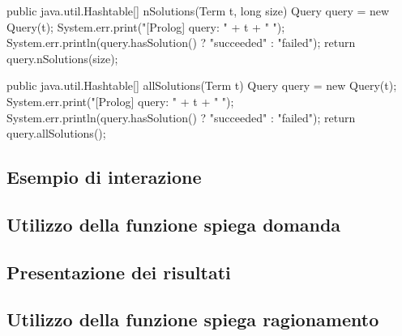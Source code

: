 \begin{javacode}
{    public java.util.Hashtable[] nSolutions(Term t, long size) {
      Query query = new Query(t);
      System.err.print("[Prolog] query: " + t + " ");
      System.err.println(query.hasSolution() ? "succeeded" : "failed");
      return query.nSolutions(size);
    }
    
    public java.util.Hashtable[] allSolutions(Term t) {
      Query query = new Query(t);
      System.err.print("[Prolog] query: " + t + " ");
      System.err.println(query.hasSolution() ? "succeeded" : "failed");
      return query.allSolutions();
    }
  }
    \end{javacode}
    
    
    

\subsection{Esempio di interazione}

\subsection{Utilizzo della funzione spiega domanda}

\subsection{Presentazione dei risultati}

\subsection{Utilizzo della funzione spiega ragionamento}
